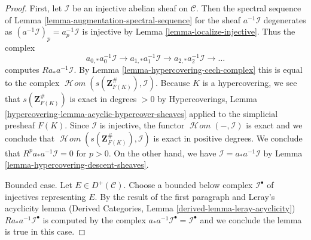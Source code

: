 \documentclass[10pt,a4paper]{amsart}
\theoremstyle{plain}
\theoremstyle{definition}
\theoremstyle{remark}
\numberwithin{equation}{subsection}
\def\SheafHom{\mathop{\mathcal{H}\!\mathit{om}}\nolimits}
\begin{document}
\begin{proof}
First, let $\mathcal{I}$ be an injective abelian sheaf on $\mathcal{C}$.
Then the spectral sequence of
Lemma \ref{lemma-augmentation-spectral-sequence}
for the sheaf $a^{-1}\mathcal{I}$ degenerates as
$(a^{-1}\mathcal{I})_p = a_p^{-1}\mathcal{I}$
is injective by Lemma \ref{lemma-localize-injective}.
Thus the complex
$$
a_{0, *}a_0^{-1}\mathcal{I} \to
a_{1, *}a_1^{-1}\mathcal{I} \to
a_{2, *}a_2^{-1}\mathcal{I} \to\ldots
$$
computes $Ra_*a^{-1}\mathcal{I}$. By
Lemma \ref{lemma-hypercovering-cech-complex}
this is equal to the complex
$\SheafHom(s(\mathbf{Z}_{F(K)}^\#), \mathcal{I})$.
Because $K$ is a hypercovering, we see that
$s(\mathbf{Z}_{F(K)}^\#)$ is exact in degrees $> 0$ by
Hypercoverings, Lemma \ref{hypercovering-lemma-acyclic-hypercover-sheaves}
applied to the simplicial presheaf $F(K)$.
Since $\mathcal{I}$ is injective, the functor $\SheafHom(-, \mathcal{I})$
is exact and we conclude that
$\SheafHom(s(\mathbf{Z}_{F(K)}^\#), \mathcal{I})$
is exact in positive degrees. We conclude that
$R^pa_*a^{-1}\mathcal{I} = 0$ for $p > 0$.
On the other hand, we have $\mathcal{I} = a_*a^{-1}\mathcal{I}$
by Lemma \ref{lemma-hypercovering-descent-sheaves}.

\medskip\noindent
Bounded case. Let $E \in D^+(\mathcal{C})$.
Choose a bounded below complex $\mathcal{I}^\bullet$ of injectives
representing $E$. By the result of the first paragraph and
Leray's acyclicity lemma
(Derived Categories, Lemma \ref{derived-lemma-leray-acyclicity})
$Ra_*a^{-1}\mathcal{I}^\bullet$
is computed by the complex
$a_*a^{-1}\mathcal{I}^\bullet = \mathcal{I}^\bullet$
and we conclude the lemma is true in this case.


\end{proof}
\end{document}
